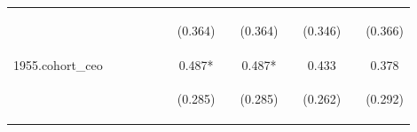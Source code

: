\begin{center}
\begin{tabular}{lcccccccccccc}
\vspace{4pt} & \begin{footnotesize}\end{footnotesize} & \begin{footnotesize}\end{footnotesize} & \begin{footnotesize}\end{footnotesize} & \begin{footnotesize}\end{footnotesize} & \begin{footnotesize}\end{footnotesize} & \begin{footnotesize}(0.364)\end{footnotesize} & \begin{footnotesize}\end{footnotesize} & \begin{footnotesize}(0.364)\end{footnotesize} & \begin{footnotesize}\end{footnotesize} & \begin{footnotesize}(0.346)\end{footnotesize} & \begin{footnotesize}\end{footnotesize} & \begin{footnotesize}(0.366)\end{footnotesize} \\
1955.cohort\_ceo &  &  &  &  &  & 0.487* &  & 0.487* &  & 0.433 &  & 0.378 \\
\vspace{4pt} & \begin{footnotesize}\end{footnotesize} & \begin{footnotesize}\end{footnotesize} & \begin{footnotesize}\end{footnotesize} & \begin{footnotesize}\end{footnotesize} & \begin{footnotesize}\end{footnotesize} & \begin{footnotesize}(0.285)\end{footnotesize} & \begin{footnotesize}\end{footnotesize} & \begin{footnotesize}(0.285)\end{footnotesize} & \begin{footnotesize}\end{footnotesize} & \begin{footnotesize}(0.262)\end{footnotesize} & \begin{footnotesize}\end{footnotesize} & \begin{footnotesize}(0.292)\end{footnotesize} \\

\end{tabular}
\end{center}
